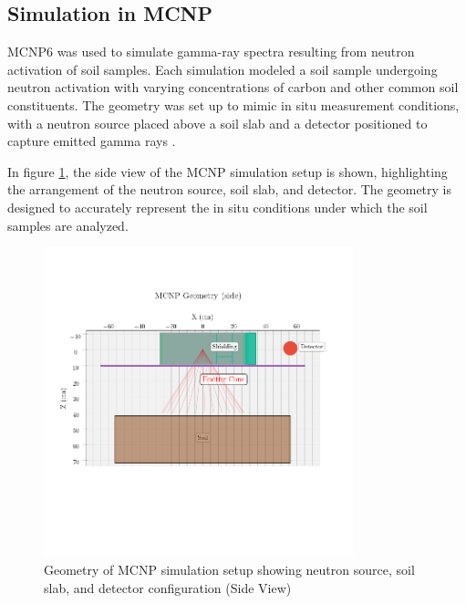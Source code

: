 \subsection{Simulation in MCNP}

MCNP6 \cite{werner_mcnp_2017} was used to simulate gamma-ray spectra resulting from neutron activation of soil samples. Each simulation modeled a soil sample undergoing neutron activation with varying concentrations of carbon and other common soil constituents. The geometry was set up to mimic in situ measurement conditions, with a neutron source placed above a soil slab and a detector positioned to capture emitted gamma rays \cite{kavetskiy_neutron-stimulated_2017}.


In figure \ref{fig:mcnp_geometry}, the side view of the MCNP simulation setup is shown, highlighting the arrangement of the neutron source, soil slab, and detector. The geometry is designed to accurately represent the in situ conditions under which the soil samples are analyzed.


\begin{figure}[H]
\centering
\includegraphics[width=0.8\textwidth,clip,trim=0cm 5cm 0cm 2cm]{../Figures/DataGeneration/MCNPGeometry.png}
\caption{Geometry of MCNP simulation setup showing neutron source, soil slab, and detector configuration (Side View)}
\label{fig:mcnp_geometry}
\end{figure}

